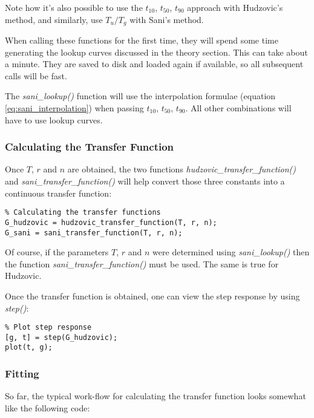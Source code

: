 Note how it's  also  possible  to  use the $t_{10}$, $t_{50}$, $t_{90}$ approach
with  Hudzovic's method,  and  similarly,  use  $T_u/T_g$  with  Sani's  method.

When  calling  these  functions  for  the  first time, they will spend some time
generating  the  lookup  curves  discussed in the theory section. This can  take
about a minute. They are saved to  disk  and  loaded  again if available, so all
subsequent calls will be fast.

The  \textit{sani\_lookup()}  function  will  use  the   interpolation  formulae
(equation  \ref{eq:sani_interpolation})   when   passing   $t_{10}$,   $t_{50}$,
$t_{90}$.   All  other  combinations   will   have   to   use   lookup   curves.


\subsubsection*{Calculating the Transfer Function}

Once    $T$,    $r$    and    $n$    are    obtained,    the    two    functions
\textit{hudzovic\_transfer\_function()}  and \textit{sani\_transfer\_function()}
will help  convert  those  three  constants into a continuous transfer function:

\begin{lstlisting}
% Calculating the transfer functions
G_hudzovic = hudzovic_transfer_function(T, r, n);
G_sani = sani_transfer_function(T, r, n);
\end{lstlisting}

Of  course,  if  the  parameters  $T$,  $r$   and   $n$  were  determined  using
\textit{sani\_lookup()} then  the  function  \textit{sani\_transfer\_function()}
must be used. The same is true for Hudzovic.

Once the transfer function is obtained,  one can view the step response by using
\textit{step()}:

\begin{lstlisting}
% Plot step response
[g, t] = step(G_hudzovic);
plot(t, g);
\end{lstlisting}


\subsubsection*{Fitting}

So  far,  the  typical  work-flow  for  calculating  the transfer function looks
somewhat like the following code:

